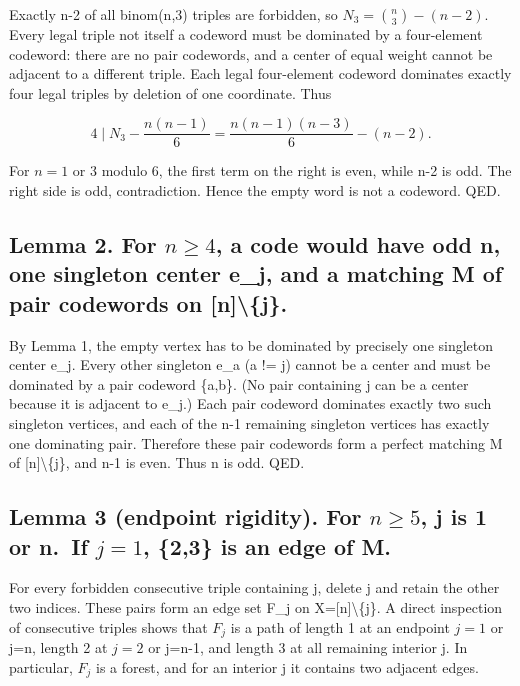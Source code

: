 \documentclass[
  11pt,
]{article}
\begin{document}
Exactly n-2 of all binom(n,3) triples are forbidden, so
\(N_3=\binom{n}{3}-(n-2)\). Every legal triple not itself a codeword
must be dominated by a four-element codeword: there are no pair
codewords, and a center of equal weight cannot be adjacent to a
different triple. Each legal four-element codeword dominates exactly
four legal triples by deletion of one coordinate. Thus

\[4\mid N_3-\frac{n(n-1)}{6}=\frac{n(n-1)(n-3)}{6}-(n-2).\]

For \(n=1\) or 3 modulo 6, the first term on the right is even, while
n-2 is odd. The right side is odd, contradiction. Hence the empty word
is not a codeword. QED.

\subsection{\texorpdfstring{Lemma 2. For \(n\ge 4\), a code would have
odd n, one singleton center e\_j, and a matching M of pair codewords on
{[}n{]}\textbackslash\{j\}.}{Lemma 2. For n\textbackslash ge 4, a code would have odd n, one singleton center e\_j, and a matching M of pair codewords on {[}n{]}\textbackslash\{j\}.}}\label{lemma-2.-for-nge-4-a-code-would-have-odd-n-one-singleton-center-e_j-and-a-matching-m-of-pair-codewords-on-nj.}

By Lemma 1, the empty vertex has to be dominated by precisely one
singleton center e\_j. Every other singleton e\_a (a != j) cannot be a
center and must be dominated by a pair codeword \{a,b\}. (No pair
containing j can be a center because it is adjacent to e\_j.) Each pair
codeword dominates exactly two such singleton vertices, and each of the
n-1 remaining singleton vertices has exactly one dominating pair.
Therefore these pair codewords form a perfect matching M of
{[}n{]}\textbackslash\{j\}, and n-1 is even. Thus n is odd. QED.

\subsection{\texorpdfstring{Lemma 3 (endpoint rigidity). For \(n\ge 5\),
j is 1 or n.~If \(j=1\), \{2,3\} is an edge of
M.}{Lemma 3 (endpoint rigidity). For n\textbackslash ge 5, j is 1 or n.~If j=1, \{2,3\} is an edge of M.}}\label{lemma-3-endpoint-rigidity.-for-nge-5-j-is-1-or-n.-if-j1-23-is-an-edge-of-m.}

For every forbidden consecutive triple containing j, delete j and retain
the other two indices. These pairs form an edge set F\_j on
X={[}n{]}\textbackslash\{j\}. A direct inspection of consecutive triples
shows that \(F_j\) is a path of length 1 at an endpoint \(j=1\) or j=n,
length 2 at \(j=2\) or j=n-1, and length 3 at all remaining interior j.
In particular, \(F_j\) is a forest, and for an interior j it contains
two adjacent edges.
\end{document}
